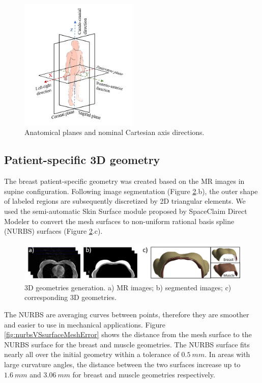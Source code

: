 \begin{figure}[!ht]
\centering
\includegraphics[width=0.5\textwidth,keepaspectratio]{figures/xyz_axis_directions.png} 
\caption{Anatomical planes and nominal Cartesian axis directions.}\label{fig:xyz_axis_directions}
\end{figure}

\subsection{Patient-specific 3D geometry}\label{subsection:patientspecificgeometry}

The breast patient-specific geometry was created based on the MR images in supine configuration. Following image segmentation (Figure \ref{fig:3dgeometries}.b), the outer shape of labeled regions are subsequently discretized by 2D triangular elements.  We used the semi-automatic Skin Surface module proposed by SpaceClaim Direct Modeler to convert the mesh surfaces to non-uniform rational basis spline (NURBS) surfaces (Figure \ref{fig:3dgeometries}.c). 

\begin{figure}[!h]
\centering
\includegraphics[width=\textwidth,keepaspectratio]{figures/3dgeometries.png} 
\caption{3D geometries generation. a) MR images; b) segmented images; c) corresponding 3D geometries.} \label{fig:3dgeometries}
\end{figure}

The NURBS are averaging curves between points, therefore they are smoother and easier to use in mechanical applications. Figure \ref{fig:nurbsVSsurfaceMeshError} shows the distance from the mesh surface to the NURBS surface for the breast and muscle geometries. The NURBS surface fits nearly all over the initial geometry within a tolerance of $0.5\ mm$. In areas with large curvature angles, the distance between the two surfaces increase up to $1.6\ mm$ and $3.06\ mm$ for breast and muscle geometries respectively.
 


